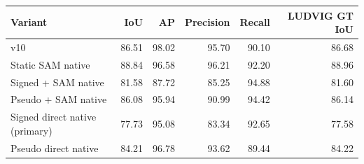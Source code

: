 \begin{tabular}{lrrrrr}
\toprule
Variant & IoU & AP & Precision & Recall & LUDVIG GT IoU \\\midrule
v10 & 86.51 & 98.02 & 95.70 & 90.10 & 86.68 \\
Static SAM native & 88.84 & 96.58 & 96.21 & 92.20 & 88.96 \\
Signed + SAM native & 81.58 & 87.72 & 85.25 & 94.88 & 81.60 \\
Pseudo + SAM native & 86.08 & 95.94 & 90.99 & 94.42 & 86.14 \\
Signed direct native (primary) & 77.73 & 95.08 & 83.34 & 92.65 & 77.58 \\
Pseudo direct native & 84.21 & 96.78 & 93.62 & 89.44 & 84.22 \\
\bottomrule
\end{tabular}
